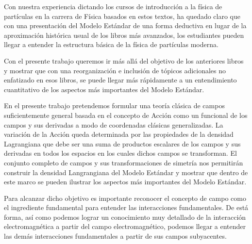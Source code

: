 Con nuestra experiencia dictando los cursos de introducción a la
física de partículas en la carrera de Física basados en estos textos,
ha quedado claro que con una presentación del Modelo Estándar de una
forma deductiva en lugar de la aproximación histórica usual de los
libros más avanzados, los estudiantes pueden llegar a entender la
estructura básica de la física de partículas moderna.

Con el presente trabajo queremos ir más allá del objetivo de los
anteriores libros y mostrar que con una reorganización e inclusión de
tópicos adicionales no enfatizado en esos libros, se puede llegar más
rápidamente a un entendimiento cuantitativo de los aspectos más
importantes del Modelo Estándar.

En el presente trabajo pretendemos formular
una teoría clásica de campos suficientemente general basada en el concepto de Acción como un funcional de los campos y sus derivadas a modo de coordenadas clásicas generalizadas. La variación de la Acción queda determinada por las propiedades de la densidad Lagrangiana que debe ser una suma de productos escalares de los campos y sus derivadas en todos los espacios en los cuales dichos campos se transforman.
El conjunto completo de campos y sus transformaciones de simetría 
nos permitirán construir la densidad Langrangiana del Modelo Estándar y
mostrar que dentro de este marco se pueden ilustrar los aspectos más
importantes del Modelo Estándar.

Para alcanzar dicho objetivo es importante reconocer el concepto de
campo como el ingrediente fundamental para entender las interacciones
fundamentales. De está forma, así como podemos lograr un conocimiento
muy detallado de la interacción electromagnética a partir del campo
electromagnético, podemos llegar a entender las demás interacciones
fundamentales a partir de sus campos subyacentes.

